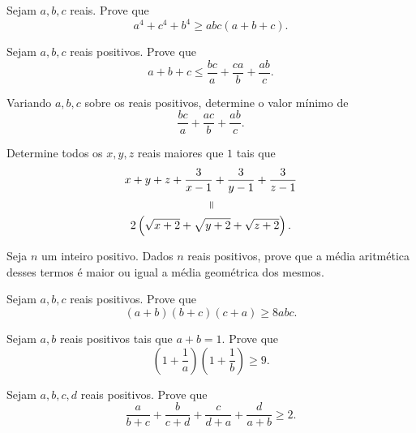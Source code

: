 \documentclass[10pt,a4paper]{article}
\begin{document}
	\begin{prob}
		Sejam $a, b, c$ reais. Prove que \[
			a^4 + c^4 + b^4 \ge abc(a + b + c).
		\]
	\end{prob}

	\begin{prob}
		Sejam $a, b, c$ reais positivos. Prove que \[
			a + b + c \le \frac{bc}{a} + \frac{ca}{b} + \frac{ab}{c}.
		\]
	\end{prob}

	\begin{prob}
		Variando $a, b, c$ sobre os reais positivos, determine o valor mínimo de \[
			\frac{bc}{a} + 
			\frac{ac}{b} + 
			\frac{ab}{c}.
		\]
	\end{prob}
	
	\begin{prob}%
		Determine todos os $x, y, z$ reais maiores que $1$ tais que
		\begin{gather*}
			x + y + z + \frac{3}{x-1} + \frac{3}{y-1} + \frac{3}{z-1}\\
			\rotatebox[origin=c]{270}{$=$}\\
			2\left(\sqrt{x+2} + \sqrt{y+2} + \sqrt{z+2}\right).
		\end{gather*}
	\end{prob}
	
	\begin{prob}
		Seja $n$ um inteiro positivo.
		Dados $n$ reais positivos, prove que a média aritmética desses termos é maior ou igual a média geométrica dos mesmos.
	\end{prob}
	
	\begin{prob}
		Sejam $a, b, c$ reais positivos. Prove que \[
			(a+b)(b+c)(c+a) \ge 8abc.
		\]
	\end{prob}


	\begin{prob}
		Sejam $a, b$ reais positivos tais que $a + b = 1$. Prove que \[
			\left(1+\frac1a\right)
			\left(1+\frac1b\right)
			\ge 9.
		\]
	\end{prob}
	

	\begin{prob}
		Sejam $a, b, c, d$ reais positivos. Prove que \[
			\frac{a}{b+c} + \frac{b}{c+d} + \frac{c}{d+a} + \frac{d}{a+b} \ge 2.
		\]
	\end{prob}
\end{document}

